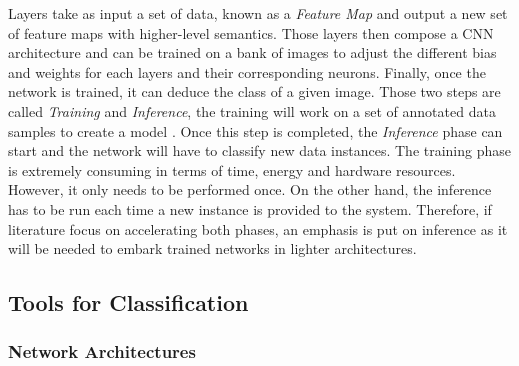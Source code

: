 Layers take as input a set of data, known as a \emph{Feature Map} and output a new set of feature maps with higher-level semantics. Those layers then compose a CNN architecture and can be trained on a bank of images to adjust the different bias and weights for each layers and their corresponding neurons. Finally, once the network is trained, it can deduce the class of a given image. Those two steps are called \emph{Training} and \emph{Inference}, the training will work on a set of annotated data samples to create a model  \cite{Abdelouahab2018}. Once this step is completed, the \emph{Inference} phase can start and the network will have to classify new data instances. The training phase is extremely consuming in terms of time, energy and hardware resources. However, it only needs to be performed once. On the other hand, the inference has to be run each time a new instance is provided to the system. Therefore, if literature focus on accelerating both phases, an emphasis is put on inference as it will be needed to embark trained networks in lighter architectures.


\subsection{Tools for Classification}


\subsubsection{Network Architectures}

